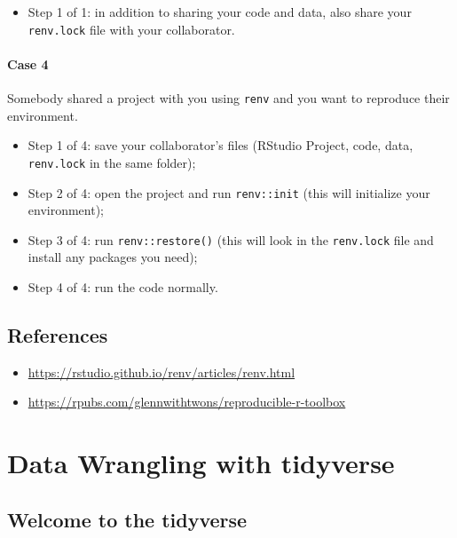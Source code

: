 \documentclass[
]{book}
\providecommand{\tightlist}{%
  \setlength{\itemsep}{0pt}\setlength{\parskip}{0pt}}
\begin{document}
\begin{itemize}
\tightlist
\item
  Step 1 of 1: in addition to sharing your code and data, also share your
  \texttt{renv.lock} file with your collaborator.
\end{itemize}

\hypertarget{case-4}{%
\subsubsection{Case 4}\label{case-4}}

Somebody shared a project with you using \texttt{renv} and you want to reproduce their
environment.

\begin{itemize}
\tightlist
\item
  Step 1 of 4: save your collaborator's files (RStudio Project, code, data,
  \texttt{renv.lock} in the same folder);
\item
  Step 2 of 4: open the project and run \texttt{renv::init} (this will initialize your
  environment);
\item
  Step 3 of 4: run \texttt{renv::restore()} (this will look in the \texttt{renv.lock} file and
  install any packages you need);
\item
  Step 4 of 4: run the code normally.
\end{itemize}

\hypertarget{references-6}{%
\section{References}\label{references-6}}

\begin{itemize}
\tightlist
\item
  \url{https://rstudio.github.io/renv/articles/renv.html}
\item
  \url{https://rpubs.com/glennwithtwons/reproducible-r-toolbox}
\end{itemize}

\hypertarget{tidyverse}{%
\chapter{Data Wrangling with tidyverse}\label{tidyverse}}

\hypertarget{welcome-to-the-tidyverse}{%
\section{Welcome to the tidyverse}\label{welcome-to-the-tidyverse}}
\end{document}
